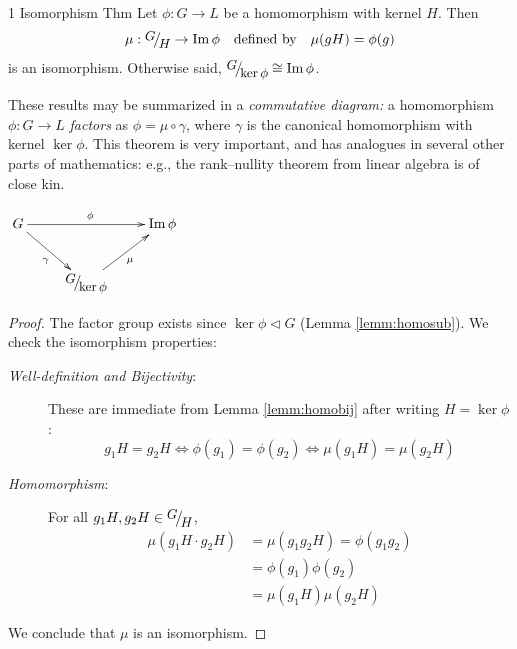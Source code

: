 \begin{thm}{1\st{} Isomorphism Thm}{}
	Let $\phi:G\to L$ be a homomorphism with kernel $H$. Then
	\[
		\mu:\quotient GH\to\image\phi
		\quad \text{defined by}\quad 
		\mu(gH)=\phi(g)
	\]
	is an isomorphism. Otherwise said, $\quotient G{\ker\phi}\cong\image\phi$.
\end{thm}


\begin{minipage}[t]{0.69\linewidth}\vspace{-5pt}
	These results may be summarized in a \emph{commutative diagram:} a homomorphism $\phi:G\to L$ \emph{factors} as $\phi=\mu\circ\gamma$, where $\gamma$ is the canonical homomorphism with kernel $\ker\phi$. This theorem is very important, and has analogues in several other parts of mathematics: e.g., the rank--nullity theorem from linear algebra is of close kin.
\end{minipage}
\hfill
\begin{minipage}[t]{0.3\linewidth}\vspace{-5pt}
	\flushright$\xymatrix{%
		G \ar[rr]^{\phi} \ar[dr]_\gamma && \image\phi\\
		& \quotient G{\ker\phi} \ar[ur]_{\mu} &
	}$
\end{minipage}



\begin{proof}
	The factor group exists since $\ker\phi\triangleleft G$ (Lemma \ref{lemm:homosub}). We check the isomorphism properties:
  \begin{description}
		\item[\normalfont\emph{Well-definition and Bijectivity}:] These are immediate from Lemma \ref{lemm:homobij} after writing $H=\ker\phi$:
		\[
			g_1H=g_2H
			\iff \phi(g_1)=\phi(g_2)
			\iff \mu(g_1H)=\mu(g_2H)
		\]
		\item[\normalfont\emph{Homomorphism}:] For all $g_1H,g_2H\in\quotient GH$,
		\begin{align*}
			\mu(g_1H\cdot g_2H)
			&=\mu(g_1g_2H)=\phi(g_1g_2)
				\tag{definition of $\mu$}\\ 
				&=\phi(g_1)\phi(g_2)
				\tag{$\phi$ is a homomorphism}\\
			&=\mu(g_1H)\mu(g_2H)
		\end{align*}
  \end{description}
	We conclude that $\mu$ is an isomorphism.
\end{proof}


